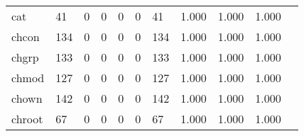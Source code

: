 \begin{longtable}{lp{1.20cm}p{1.20cm}p{1.20cm}p{1.20cm}p{1.20cm}p{1.20cm}p{1.20cm}p{1.20cm}p{1.20cm}p{1.20cm}}
cat       &                                    41 &                                                  0 &                                                  0 &                                                  0 &                                                  0 &                                                 41 &                                         1.000 &                                              1.000 &                                              1.000 \\
chcon     &                                   134 &                                                  0 &                                                  0 &                                                  0 &                                                  0 &                                                134 &                                         1.000 &                                              1.000 &                                              1.000 \\
chgrp     &                                   133 &                                                  0 &                                                  0 &                                                  0 &                                                  0 &                                                133 &                                         1.000 &                                              1.000 &                                              1.000 \\
chmod     &                                   127 &                                                  0 &                                                  0 &                                                  0 &                                                  0 &                                                127 &                                         1.000 &                                              1.000 &                                              1.000 \\
chown     &                                   142 &                                                  0 &                                                  0 &                                                  0 &                                                  0 &                                                142 &                                         1.000 &                                              1.000 &                                              1.000 \\
chroot    &                                    67 &                                                  0 &                                                  0 &                                                  0 &                                                  0 &                                                 67 &                                         1.000 &                                              1.000 &                                              1.000 \\

\end{longtable}
